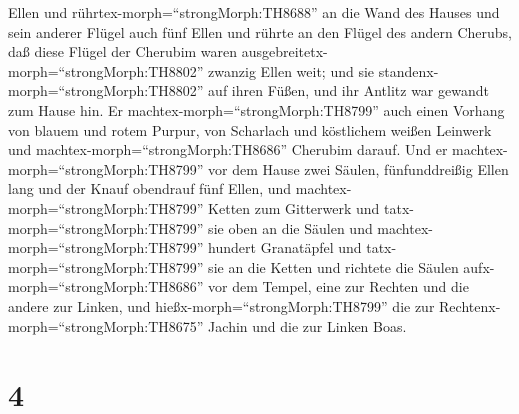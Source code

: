 Ellen und rührtex-morph=``strongMorph:TH8688'' an die Wand des Hauses
und sein anderer Flügel auch fünf Ellen und rührte an den Flügel des
andern Cherubs,  daß diese Flügel der Cherubim waren
ausgebreitetx-morph=``strongMorph:TH8802'' zwanzig Ellen weit; und sie
standenx-morph=``strongMorph:TH8802'' auf ihren Füßen, und ihr Antlitz
war gewandt zum Hause hin.  Er
machtex-morph=``strongMorph:TH8799'' auch einen Vorhang von blauem und
rotem Purpur, von Scharlach und köstlichem weißen Leinwerk und
machtex-morph=``strongMorph:TH8686'' Cherubim darauf.  Und
er machtex-morph=``strongMorph:TH8799'' vor dem Hause zwei Säulen,
fünfunddreißig Ellen lang und der Knauf obendrauf fünf Ellen,
 und machtex-morph=``strongMorph:TH8799'' Ketten zum
Gitterwerk und tatx-morph=``strongMorph:TH8799'' sie oben an die Säulen
und machtex-morph=``strongMorph:TH8799'' hundert Granatäpfel und
tatx-morph=``strongMorph:TH8799'' sie an die Ketten  und
richtete die Säulen aufx-morph=``strongMorph:TH8686'' vor dem Tempel,
eine zur Rechten und die andere zur Linken, und
hießx-morph=``strongMorph:TH8799'' die zur
Rechtenx-morph=``strongMorph:TH8675'' Jachin und die zur Linken Boas.

\hypertarget{section-3}{%
\section{4}\label{section-3}}


